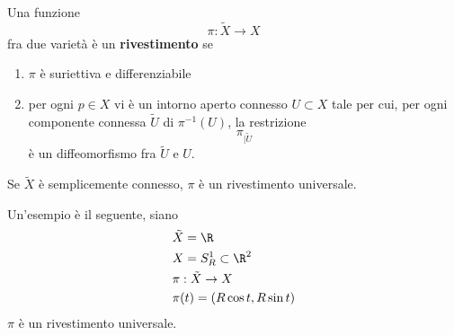 \documentclass[10pt, letterpaper]{report}
\begin{document}
\begin{definizione}\label{def:rivestimento}
    Una funzione \begin{equation}
        \pi:\tilde X\rightarrow X 
    \end{equation}
    fra due varietà è un \textbf{rivestimento} se \begin{enumerate}
        \item $\pi$ è suriettiva e differenziabile
        \item per ogni $p\in X$ vi è un intorno aperto connesso $U\subset X$ tale per cui, per ogni componente connessa $\tilde U$
 di $\pi^{-1}(U)$, la restrizione $$ \pi_{|\tilde U}$$ è un diffeomorfismo fra $\tilde U$ e $U$.    \end{enumerate}
 Se $\tilde X$ è semplicemente connesso, $\pi$ è un rivestimento universale.
\end{definizione}
Un'esempio è il seguente, siano\begin{align}
    &\tilde X =\R\\ 
    &X=S_R^1\subset \R^2\\
    &\pi : \tilde X\rightarrow X\\ 
    &\pi(t)=(R\cos t,R\sin t)
\end{align}
$\pi$ è un rivestimento universale.
\end{document}
